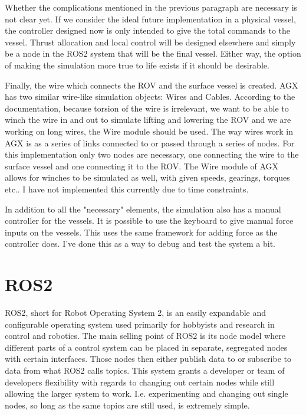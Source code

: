Whether the complications mentioned in the previous paragraph are necessary is not clear yet. If we consider the ideal future implementation in a physical vessel, the controller designed now is only intended to give the total commands to the vessel. Thrust allocation and local control will be designed elsewhere and simply be a node in the ROS2 system that will be the final vessel. Either way, the option of making the simulation more true to life exists if it should be desirable. 

Finally, the wire which connects the ROV and the surface vessel is created. AGX has two similar wire-like simulation objects: Wires and Cables. According to the documentation, because torsion of the wire is irrelevant, we want to be able to winch the wire in and out to simulate lifting and lowering the ROV and we are working on long wires, the Wire module should be used. The way wires work in AGX is as a series of links connected to or passed through a series of nodes. For this implementation only two nodes are necessary, one connecting the wire to the surface vessel and one connecting it to the ROV. The Wire module of AGX allows for winches to be simulated as well, with given speeds, gearings, torques etc.. I have not implemented this currently due to time constraints. 

In addition to all the "necessary" elements, the simulation also has a manual controller for the vessels. It is possible to use the keyboard to give manual force inputs on the vessels. This uses the same framework for adding force as the controller does. I've done this as a way to debug and test the system a bit.



\section{ROS2}
\label{sec:ros}
ROS2, short for Robot Operating System 2, is an easily expandable and configurable operating system used primarily for hobbyists and research in control and robotics. The main selling point of ROS2 is its node model where different parts of a control system can be placed in separate, segregated nodes with certain interfaces. Those nodes then either publish data to or subscribe to data from what ROS2 calls topics. This system grants a developer or team of developers flexibility with regards to changing out certain nodes while still allowing the larger system to work. I.e. experimenting and changing out single nodes, so long as the same topics are still used, is extremely simple. 

